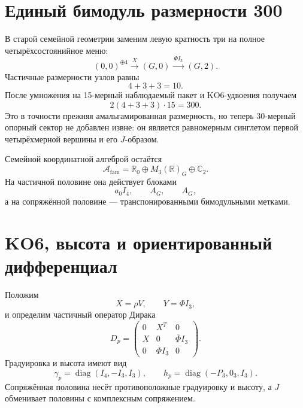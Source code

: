 \section{Единый бимодуль размерности 300}

В старой семейной геометрии заменим левую кратность три на полное
четырёхсостоянийное меню:
\begin{equation}
 (0,0)^{\oplus4}
 \xrightarrow{\ X\ }
 (G,0)
 \xrightarrow{\ \Phi I_3\ }
 (G,2).
 \label{eq:v5-affine-family-chain}
\end{equation}
Частичные размерности узлов равны
\begin{equation}
 4+3+3=10.
\end{equation}
После умножения на 15-мерный наблюдаемый пакет и KO6-удвоения получаем
\begin{equation}
 \boxed{
 2(4+3+3)\cdot15=300.
 }
 \label{eq:v5-affine-m300-dimension}
\end{equation}
Это в точности прежняя амальгамированная размерность, но теперь 30-мерный
опорный сектор не добавлен извне: он является равномерным синглетом первой
четырёхмерной вершины и его $J$-образом.

Семейной координатной алгеброй остаётся
\begin{equation}
 \mathcal A_{\mathrm{fam}}
 =\mathbb R_0\oplus M_3(\mathbb R)_G\oplus\mathbb C_2.
\end{equation}
На частичной половине она действует блоками
\begin{equation}
 a_0I_4,
 \qquad A_G,
 \qquad A_G,
\end{equation}
а на сопряжённой половине --- транспонированными бимодульными метками.

\section{KO6, высота и ориентированный дифференциал}

Положим
\begin{equation}
 X=\rho V,
 \qquad Y=\Phi I_3,
\end{equation}
и определим частичный оператор Дирака
\begin{equation}
 D_p=
 \begin{pmatrix}
 0&X^T&0\\
 X&0&\overline\Phi I_3\\
 0&\Phi I_3&0
 \end{pmatrix}.
\end{equation}
Градуировка и высота имеют вид
\begin{equation}
 \gamma_p=\operatorname{diag}(I_4,-I_3,I_3),
 \qquad
 h_p=\operatorname{diag}(-P_3,0_3,I_3).
 \label{eq:v5-affine-height}
\end{equation}
Сопряжённая половина несёт противоположные градуировку и высоту, а $J$
обменивает половины с комплексным сопряжением.

